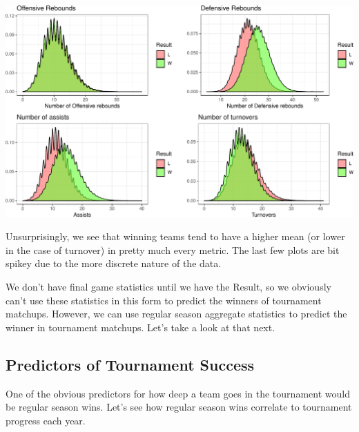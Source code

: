 \documentclass[]{article}
\newenvironment{Shaded}{\begin{snugshade}}{\end{snugshade}}
\newcommand{\KeywordTok}[1]{\textcolor[rgb]{0.13,0.29,0.53}{\textbf{#1}}}
\newcommand{\DataTypeTok}[1]{\textcolor[rgb]{0.13,0.29,0.53}{#1}}
\newcommand{\DecValTok}[1]{\textcolor[rgb]{0.00,0.00,0.81}{#1}}
\newcommand{\StringTok}[1]{\textcolor[rgb]{0.31,0.60,0.02}{#1}}
\newcommand{\CommentTok}[1]{\textcolor[rgb]{0.56,0.35,0.01}{\textit{#1}}}
\newcommand{\OperatorTok}[1]{\textcolor[rgb]{0.81,0.36,0.00}{\textbf{#1}}}
\newcommand{\NormalTok}[1]{#1}
\begin{document}
\includegraphics{EDA_files/figure-latex/unnamed-chunk-6-1.pdf}

Unsurprisingly, we see that winning teams tend to have a higher mean (or
lower in the case of turnover) in pretty much every metric. The last few
plots are bit spikey due to the more discrete nature of the data.

We don't have final game statistics until we have the Result, so we
obviously can't use these statistics in this form to predict the winners
of tournament matchups. However, we can use regular season aggregate
statistics to predict the winner in tournament matchups. Let's take a
look at that next.

\subsection{Predictors of Tournament Success}\label{predictors}

One of the obvious predictors for how deep a team goes in the tournament
would be regular season wins. Let's see how regular season wins
correlate to tournament progress each year.

\begin{Shaded}
\end{Shaded}
\end{document}
